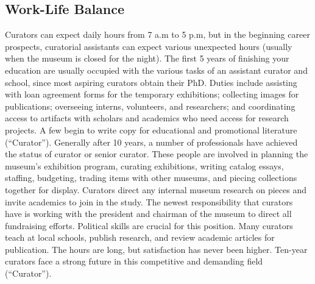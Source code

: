 \begin{multicols}{2}
\section{Work-Life Balance}
	Curators can expect daily hours from 7 a.m to 5 p.m, but in the beginning career prospects, curatorial assistants can expect various unexpected hours (usually when the museum is closed for the night). The first 5 years of finishing your education are usually occupied with the various tasks of an assistant curator and school, since most aspiring curators obtain their PhD. Duties include assisting with loan agreement forms for the temporary exhibitions; collecting images for publications; overseeing interns, volunteers, and researchers; and coordinating access to artifacts with scholars and academics who need access for research projects. A few begin to write copy for educational and promotional literature (“Curator”). Generally after 10 years, a number of professionals have achieved the status of curator or senior curator. These people are involved in planning the museum’s exhibition program, curating exhibitions, writing catalog essays, staffing, budgeting, trading items with other museums, and piecing collections together for display. Curators direct any internal museum research on pieces and invite academics to join in the study. The newest responsibility that curators have is working with the president and chairman of the museum to direct all fundraising efforts. Political skills are crucial for this position. Many curators teach at local schools, publish research, and review academic articles for publication. The hours are long, but satisfaction has never been higher. Ten-year curators face a strong future in this competitive and demanding field (“Curator”). 
\end{multicols}